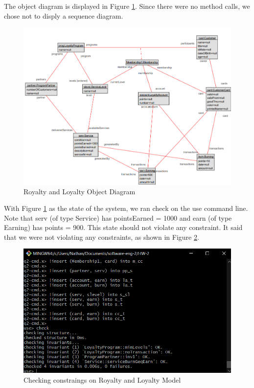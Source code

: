 \documentclass{article}
\begin{document}
	\noindent
	The object diagram is displayed in Figure \ref{fig:q2obj}. Since there were no method calls, we chose not to disply a sequence diagram.
	
	\begin{figure}[h]
		\includegraphics[width=\linewidth]{Q2obj.png}
		\caption{Royalty and Loyalty Object Diagram}
		\label{fig:q2obj}
	\end{figure}
	
	\noindent
	With Figure \ref{fig:q2obj} as the state of the system, we ran check on the use command line. Note that serv (of type Service) has pointsEarned = 1000 and earn (of type Earning) has points = 900. This state should not violate any constraint. It said that we were not violating any constraints, as shown in Figure \ref{fig:q2cmd}.
	
	\begin{figure}[h]
		\includegraphics[width=\linewidth]{Q2cmd.png}
		\caption{Checking constraings on Royalty and Loyalty Model}
		\label{fig:q2cmd}
	\end{figure}
	
\end{document}
